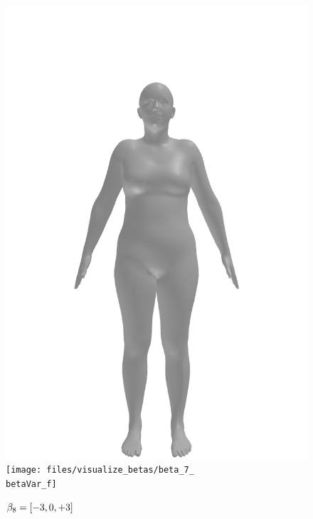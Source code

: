 \begin{figure}[ht!]
\begin{minipage}[b]{\textwidth}
        \includegraphics[width=\imgWidth]{files/visualize_betas/baseline_f}
        \texttt{[image: files/visualize\_betas/beta\_7\_\\betaVar\_f]}
        \caption[Effect of varying $\beta_8$ in SMPL]{$\beta_8 = [-3, 0, +3]$}
    \end{minipage}
\end{figure}

